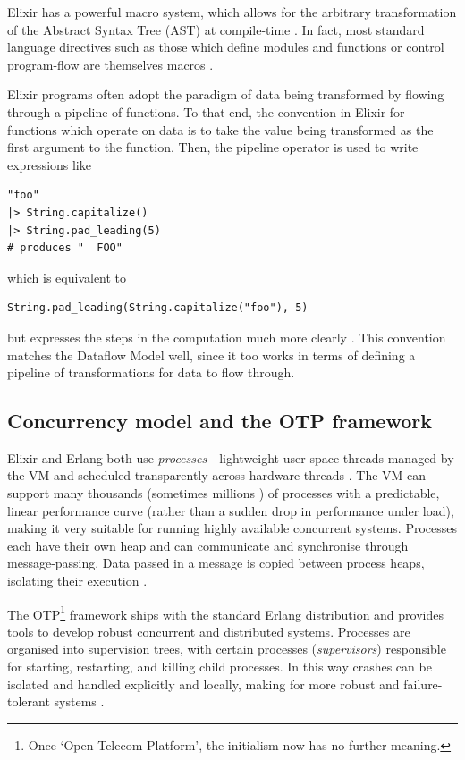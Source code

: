 Elixir has a powerful macro system, which allows for the arbitrary transformation of the Abstract Syntax Tree (AST) at compile-time \cite[p.~13]{Elixir-Metaprogramming}.
In fact, most standard language directives such as those which define modules and functions or control program-flow are themselves macros \cite[p.~21]{Elixir-Metaprogramming}.

Elixir programs often adopt the paradigm of data being transformed by flowing through a pipeline of functions.
To that end, the convention in Elixir for functions which operate on data is to take the value being transformed as the first argument to the function.
Then, the pipeline operator \exs{|>} is used to write expressions like
\begin{verbatim}
"foo"
|> String.capitalize()
|> String.pad_leading(5)
# produces "  FOO"
\end{verbatim}
which is equivalent to
\begin{verbatim}
String.pad_leading(String.capitalize("foo"), 5)		
\end{verbatim}
but expresses the steps in the computation much more clearly \cite[p.~56]{Thomas:2016}.
This convention matches the Dataflow Model well, since it too works in terms of defining a pipeline of transformations for data to flow through.

\subsection{Concurrency model and the OTP framework}\label{sec:prep:elixir:otp}

Elixir and Erlang both use \emph{processes}---lightweight user-space threads managed by the VM and scheduled transparently across hardware threads \cite[p.~185]{Thomas:2016}.
The VM can support many thousands (sometimes millions \cite{elixir-2million-processes}) of processes with a predictable, linear performance curve (rather than a sudden drop in performance under load), making it very suitable for running highly available concurrent systems.
Processes each have their own heap and can communicate and synchronise through message-passing.
Data passed in a message is copied between process heaps, isolating their execution \cite[p.~29]{scalability_erlang_otp}.

The OTP\footnote{
Once `Open Telecom Platform', the initialism now has no further meaning.
} framework ships with the standard Erlang distribution and provides tools to develop robust concurrent and distributed systems.
Processes are organised into supervision trees, with certain processes (\emph{supervisors}) responsible for starting, restarting, and killing child processes.
In this way crashes can be isolated and handled explicitly and locally, making for more robust and failure-tolerant systems \cite[p.~169]{scalability_erlang_otp}.

